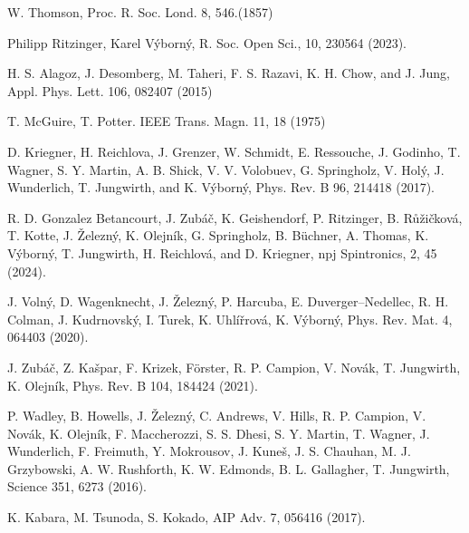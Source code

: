 \documentclass[prb,showpacs,amsmath,amssymb,superscriptaddress,twocolumn,floatfix]{revtex4-1}
\begin{document}
\begin{thebibliography}{99}



 W. Thomson, Proc. R. Soc. Lond. 8, 546.(1857) %

 Philipp Ritzinger, Karel V\'yborn\'y, R. Soc. Open Sci., 10, 230564 (2023). %

 H. S. Alagoz, J. Desomberg, M. Taheri, F. S. Razavi, K. H. Chow, and J. Jung, Appl. Phys. Lett. 106, 082407 (2015)

 T. McGuire, T. Potter. IEEE Trans. Magn. 11, 18 (1975) %

 D. Kriegner, H. Reichlova, J. Grenzer, W. Schmidt, E. Ressouche, J. Godinho, T. Wagner, S. Y. Martin, A. B. Shick, V. V. Volobuev, G. Springholz, V. Hol\'{y}, J. Wunderlich, T. Jungwirth, and K. V\'{y}born\'{y}, Phys. Rev. B 96, 214418 (2017). %

 R. D. Gonzalez Betancourt, J. Zub\'a\v{c}, K. Geishendorf, P. Ritzinger, B. R\r{u}\v{z}i\v{c}kov\'a, T. Kotte, J. \v{Z}elezn\'y, K. Olejn\'ik, G. Springholz, B. B\"uchner, A. Thomas, K. V\'yborn\'y, T. Jungwirth, H. Reichlov\'a, and D. Kriegner, npj Spintronics, 2, 45 (2024). %


 J. Voln\'y, D. Wagenknecht, J. \v{Z}elezn\'y, P. Harcuba, E. Duverger–Nedellec, R. H. Colman, J. Kudrnovsk\'y, I. Turek, K. Uhl\'i\v{r}rov\'a, K. V\'yborn\'y, Phys. Rev. Mat. 4, 064403 (2020).%

 J. Zub\'a\v{c}, Z. Ka\v{s}par, F. Krizek, F\"orster, R. P. Campion, V. Nov\'ak, T. Jungwirth, K. Olejn\'ik, Phys. Rev. B 104, 184424 (2021). %

 P. Wadley, B. Howells, J. \v{Z}elezn\'y, C. Andrews, V. Hills, R. P. Campion, V. Nov\'ak, K. Olejn\'ik, F. Maccherozzi, S. S. Dhesi, S. Y. Martin, T. Wagner, J. Wunderlich, F. Freimuth, Y. Mokrousov, J. Kune\v{s}, J. S. Chauhan, M. J. Grzybowski, A. W. Rushforth, K. W. Edmonds, B. L. Gallagher, T. Jungwirth, Science 351, 6273 (2016). %

 K. Kabara, M. Tsunoda, S. Kokado, AIP Adv. 7, 056416 (2017). %


\end{thebibliography}
\end{document}
